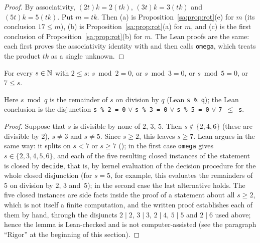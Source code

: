 \begin{proof}
By associativity, $(2t)k=2(tk)$, $(3t)k=3(tk)$ and $(5t)k=5(tk)$. Put $m=tk$. Then (a) is
Proposition~\ref{sa:prop:rot}(e) for $m$ (its conclusion $17\le m$), (b) is Proposition~\ref{sa:prop:rot}(a) for $m$,
and (c) is the first conclusion of Proposition~\ref{sa:prop:rot}(b) for $m$. The Lean proofs are the same: each first
proves the associativity identity with  and then calls \texttt{omega}, which treats the product
$tk$ as a single unknown.
\end{proof}

\begin{lemma}\label{sa:lem:split}\raggedright
For every $s\in\mathbb N$ with $2\le s$: ${s\bmod2=0}$, or ${s\bmod3=0}$, or ${s\bmod5=0}$, or ${7\le s}$.
\end{lemma}

Here $s\bmod q$ is the remainder of $s$ on division by $q$ (Lean \mbox{\texttt{s \% q}}); the Lean conclusion is the
disjunction \mbox{\texttt{s \% 2 = 0}} $\lor$ \mbox{\texttt{s \% 3 = 0}} $\lor$ \mbox{\texttt{s \% 5 = 0}} $\lor$
\mbox{\texttt{7} $\le$ \texttt{s}}.

\begin{proof}
Suppose that $s$ is divisible by none of $2$, $3$, $5$. Then $s\notin\{2,4,6\}$ (these are divisible by $2$),
$s\ne3$ and $s\ne5$. Since $s\ge2$, this leaves $s\ge7$. Lean argues in the same way: it splits on $s<7$ or $s\ge7$
(); in the first case \texttt{omega} gives $s\in\{2,3,4,5,6\}$, and each of the five resulting
closed instances of the statement is closed by \texttt{decide}, that is, by kernel evaluation of the decision procedure
for the whole closed disjunction (for $s=5$, for example, this evaluates the remainders of $5$ on division by $2$, $3$
and~$5$); in the second case the last alternative holds. The five closed instances are side facts inside the proof
of a statement about all $s\ge2$, which is not itself a finite computation, and the written proof establishes each of
them by hand, through the disjuncts $2\mid2$, $3\mid3$, $2\mid4$, $5\mid5$ and $2\mid6$ used above; hence the lemma
is Lean-checked and is not computer-assisted (see the paragraph ``Rigor'' at the beginning of this section).
\end{proof}

